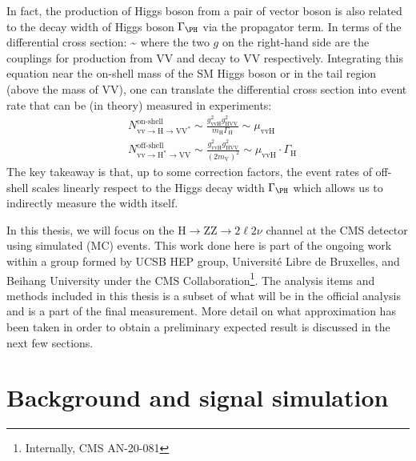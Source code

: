 In fact, the production of Higgs boson from a pair of vector boson is also related to the
decay width of Higgs boson $\Gamma_\text{\PH}$ via the propagator term. In terms of the
differential cross section:
\be
\label{eqn:diff_xsec}
\sim 
{}
\ee
where the two $g$ on the right-hand side are the couplings for production from VV and decay
to VV respectively. Integrating this equation near the on-shell mass of the SM Higgs boson 
or in the tail region (above the mass of VV), one can translate the differential cross section
into event rate that can be (in theory) measured in experiments:
\begin{equation}
\begin{split}
&N_{\mathrm{vv} \rightarrow \mathrm{H} \rightarrow \mathrm{VV}^{*}}^{\text{on-shell}} \sim \frac{g_{\mathrm{vvH}}^{2} g_{\mathrm{HVV}}^{2}}{m_{\mathrm{H}} \Gamma_{\mathrm{H}}} \sim \mu_{\mathrm{vvH}}
\\
&N_{\mathrm{vv} \rightarrow \mathrm{H}^{*} \rightarrow \mathrm{VV}}^{\text{off-shell}} \sim \frac{g_{\mathrm{vvH}}^{2} g_{\mathrm{HVV}}^{2}}{\left(2 m_{\mathrm{V}}\right)^{2}} \sim \mu_{\mathrm{vvH}} \cdot \Gamma_{\mathrm{H}}
\end{split}
\end{equation}
The key takeaway is that, up to some correction factors, the event rates of off-shell scales
linearly respect to the Higgs decay width $\Gamma_\text{\PH}$ which allows us to indirectly
measure the width itself.

In this thesis, we will focus on the $\mathrm{H} \rightarrow \mathrm{ZZ} \rightarrow 2\ell2\nu$ channel
at the CMS detector using simulated (MC) events. This work done here is part of the ongoing work
within a group formed by UCSB HEP group, Universit\'e Libre de Bruxelles, and Beihang University under
the CMS Collaboration\footnote{Internally, CMS AN-20-081}. The analysis items and methods included in this
thesis is a subset of what will be in the official analysis and is a part of the final measurement. More
detail on what approximation has been taken in order to obtain a preliminary expected result is discussed
in the next few sections.



\section{Background and signal simulation}

